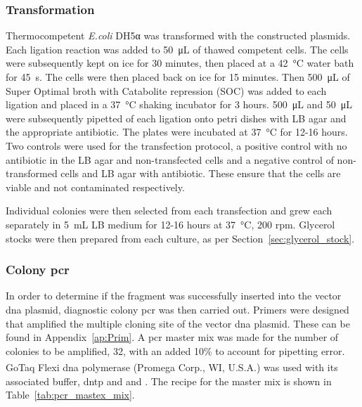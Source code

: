 \subsubsection{Transformation}
\label{sec:transfection}
Thermocompetent \textit{E.coli} DH5α was transformed with the constructed plasmids. Each ligation reaction was added to \SI{50}{\micro\liter} of thawed competent cells. The cells were subsequently kept on ice for 30 minutes, then placed at a \SI{42}{\celsius} water bath for \SI{45}{\second}. The cells were then placed back on ice for 15 minutes. Then \SI{500}{\micro\liter} of Super Optimal broth with Catabolite repression (SOC) was added to each ligation and placed in a \SI{37}{\celsius} shaking incubator for 3 hours. \SI{500}{\micro\liter} and \SI{50}{\micro\liter} were subsequently pipetted of each ligation onto petri dishes with LB agar and the appropriate antibiotic. The plates were incubated at \SI{37}{\celsius} for 12-16 hours. Two controls were used for the transfection protocol, a positive control with no antibiotic in the LB agar and non-transfected cells and a negative control of non-transformed cells and LB agar with antibiotic. These ensure that the cells are viable and not contaminated respectively. 

Individual colonies were then selected from each transfection and grew each separately in \SI{5}{\milli\liter} LB medium for 12-16 hours at \SI{37}{\celsius}, 200 rpm. Glycerol stocks were then prepared from each culture, as per Section~\ref{sec:glycerol_stock}.



\subsubsection{Colony \acrshort{pcr}}

In order to determine if the fragment was successfully inserted into the vector \acrshort{dna} plasmid, diagnostic colony \acrshort{pcr} was then carried out. Primers were designed that amplified the multiple cloning site of the vector \acrshort{dna} plasmid. These can be found in Appendix~\ref{ap:Prim}. A \acrshort{pcr} master mix was made for the number of colonies to be amplified, 32, with an added 10\% to account for pipetting error. GoTaq\textsuperscript{\textregistered} Flexi \acrshort{dna} polymerase (Promega Corp., WI, U.S.A.) was used with its associated buffer, \acrshort{dntp} and and . The recipe for the master mix is shown in Table~\ref{tab:pcr_mastex_mix}.

